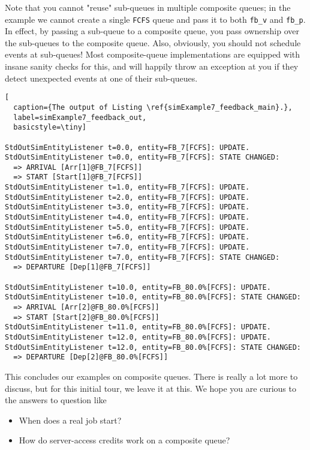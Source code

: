 Note that you cannot "reuse" sub-queues
  in multiple composite queues;
  in the example we cannot create a single
  \lstinline|FCFS| queue and pass it
  to both \lstinline|fb_v| and \lstinline|fb_p|.
In effect,
  by passing a sub-queue to a composite queue,
  you pass ownership over the sub-queues to the
  composite queue.
Also, obviously, you should not schedule events
  at sub-queues!
Most composite-queue implementations
  are equipped with insane sanity checks
  for this, and will happily throw
  an exception at you if they detect
  unexpected events at one of their sub-queues.

\begin{lstfloat}
\begin{lstlisting}[
  caption={The output of Listing \ref{simExample7_feedback_main}.},
  label=simExample7_feedback_out,
  basicstyle=\tiny]

StdOutSimEntityListener t=0.0, entity=FB_7[FCFS]: UPDATE.
StdOutSimEntityListener t=0.0, entity=FB_7[FCFS]: STATE CHANGED:
  => ARRIVAL [Arr[1]@FB_7[FCFS]]
  => START [Start[1]@FB_7[FCFS]]
StdOutSimEntityListener t=1.0, entity=FB_7[FCFS]: UPDATE.
StdOutSimEntityListener t=2.0, entity=FB_7[FCFS]: UPDATE.
StdOutSimEntityListener t=3.0, entity=FB_7[FCFS]: UPDATE.
StdOutSimEntityListener t=4.0, entity=FB_7[FCFS]: UPDATE.
StdOutSimEntityListener t=5.0, entity=FB_7[FCFS]: UPDATE.
StdOutSimEntityListener t=6.0, entity=FB_7[FCFS]: UPDATE.
StdOutSimEntityListener t=7.0, entity=FB_7[FCFS]: UPDATE.
StdOutSimEntityListener t=7.0, entity=FB_7[FCFS]: STATE CHANGED:
  => DEPARTURE [Dep[1]@FB_7[FCFS]]

StdOutSimEntityListener t=10.0, entity=FB_80.0%[FCFS]: UPDATE.
StdOutSimEntityListener t=10.0, entity=FB_80.0%[FCFS]: STATE CHANGED:
  => ARRIVAL [Arr[2]@FB_80.0%[FCFS]]
  => START [Start[2]@FB_80.0%[FCFS]]
StdOutSimEntityListener t=11.0, entity=FB_80.0%[FCFS]: UPDATE.
StdOutSimEntityListener t=12.0, entity=FB_80.0%[FCFS]: UPDATE.
StdOutSimEntityListener t=12.0, entity=FB_80.0%[FCFS]: STATE CHANGED:
  => DEPARTURE [Dep[2]@FB_80.0%[FCFS]]

\end{lstlisting}
\end{lstfloat}

This concludes our examples on composite queues.
There is really a lot more to discuss,
  but for this initial tour,
  we leave it at this.
We hope you are curious to the answers
  to question like
\begin{itemize}
  \item When does a real job start?
  \item How do server-access credits work on a composite queue?
\end{itemize}

